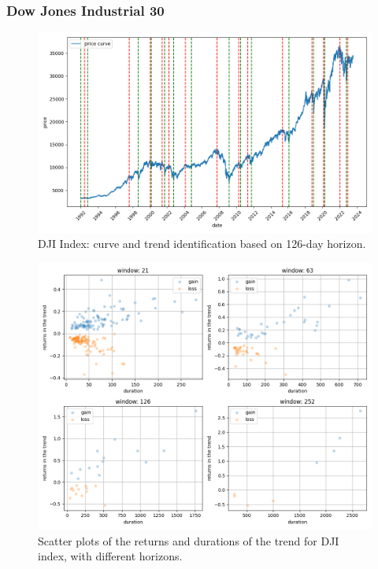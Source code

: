\subsubsection{Dow Jones Industrial 30}


\begin{figure}[h]
	\centering
	\includegraphics[width=0.8\linewidth]{chapters/chapter1/figures/curve_DJI_126D}
	\caption{DJI Index: curve and trend identification based on 126-day horizon.}
	\label{fig:curvedji126d}
\end{figure}

\begin{figure}[h]
	\centering
	\includegraphics[width=1\linewidth]{chapters/chapter1/figures/scatter_DJI}
	\caption{Scatter plots of the returns and durations of the trend for DJI index, with different horizons.}
	\label{fig:scatterdji}
\end{figure}

